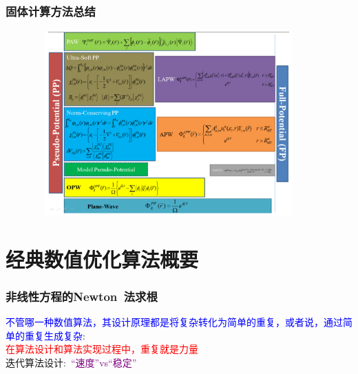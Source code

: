 \frame
{
	\frametitle{固体计算方法总结}
\begin{figure}[h!]
\centering
\vspace*{-0.25in}
\includegraphics[height=2.80in,width=4.10in,viewport=0 0 1150 850,clip]{Figures/Pseudo-Full_Potential-2.png}
\label{Pseudo-Full_Poential}
\end{figure}
}

\section{经典数值优化算法概要}
\frame
{
	\frametitle{非线性方程的\rm{Newton~}法求根}
	\textcolor{blue}{不管哪一种数值算法，其设计原理都是将复杂转化为简单的重复，或者说，通过简单的重复生成复杂}:\\
	\textcolor{red}{在算法设计和算法实现过程中，重复就是力量}\\
迭代算法设计:~\textcolor{purple}{“速度”\textrm{vs}“稳定”}
\begin{figure}[h!]
\centering
{}
\label{Equation_Newon}
\end{figure}
}

